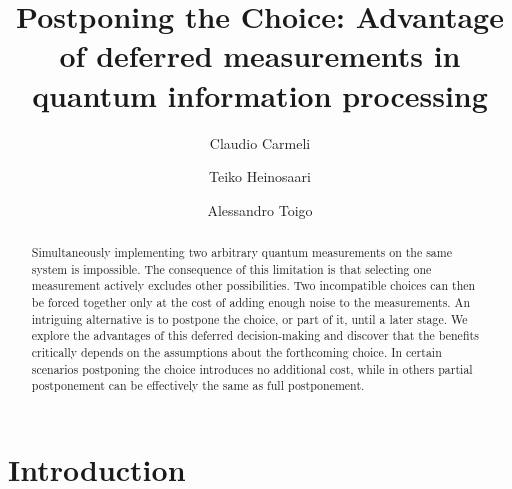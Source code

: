 \documentclass[12pt,reqno]{amsart}
\theoremstyle{definition}
\begin{document}
\title[]{Postponing the Choice: Advantage of deferred measurements in quantum information processing}

\author[C.Carmeli]{Claudio Carmeli}
\address{Claudio Carmeli, DIME , Universit\`a di Genova, via Balbi 5, 16126 Genova, Italy\\
INFN Sezione di Genova, Via Dodecaneso 33, 16146 Genova, Italy}
\author[T.Heinosaari]{Teiko Heinosaari}
\address{Teiko Heinosaari, Faculty of Information Technology, University of Jyv\"askyl\" a, Finland}
\author[A.Toigo]{Alessandro Toigo}
\address{Alessandro Toigo, Dipartimento di Matematica, Politecnico di Milano, Piazza Leonardo da Vinci 32, 20133 Milano, Italy \\
Istituto Nazionale di Fisica Nucleare, Sezione di Milano, Via Celoria 16, 20133 Milano, Italy}


\begin{abstract}
Simultaneously implementing two arbitrary quantum measurements on the same system is impossible. The consequence of this limitation is that selecting one measurement actively excludes other possibilities. Two incompatible choices can then be forced together only at the cost of adding enough noise to the measurements.
An intriguing alternative is to postpone the choice, or part of it, until a later stage. We explore the advantages of this deferred decision-making and discover that the benefits critically depends on the assumptions about the forthcoming choice. In certain scenarios postponing the choice introduces no additional cost, while in others partial postponement can be effectively the same as full postponement.
\end{abstract}

\maketitle


\section{Introduction}\label{sec:intro}
\end{document}
